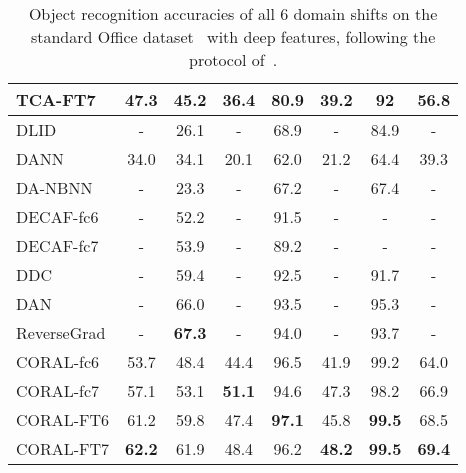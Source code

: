 \documentclass[letterpaper]{article}
\begin{document}
\begin{table}[t]
\begin{center}
{\begin{tabular}{|l||c|c|c|c|c|c|c|}
TCA-FT7	&47.3	&45.2	&36.4	&80.9	&39.2	&92 &56.8 \\
\hline
\hline
DLID	&-&	26.1&-&		68.9&-&84.9&-\\ 
\hline
DANN &34.0	&34.1&	20.1&	62.0&	21.2&	64.4&39.3\\
\hline
DA-NBNN	&-	&23.3&	-&	67.2&	-&	67.4&-\\
\hline
DECAF-fc6  &-	&52.2&	-&	91.5&	-&	-&-\\
\hline
DECAF-fc7  &-	&53.9&	-&	89.2&	-&	-&-\\
\hline
DDC	 &-	&59.4	&-	&92.5	&-	&91.7  &- \\
\hline
DAN	 &-	&66.0	&-	&93.5	&-	&95.3  &- \\
\hline
ReverseGrad	 &-	&\textbf{67.3}	&-	&94.0	&-	&93.7  &- \\
\hline
\hline
CORAL-fc6	&53.7	&48.4	&44.4	&96.5	&41.9	&99.2&64.0\\
\hline
CORAL-fc7	&57.1	&53.1	&\textbf{51.1}	&94.6	&47.3	&98.2&66.9\\
\hline
CORAL-FT6	&61.2	&59.8	&47.4	&\textbf{97.1}	&45.8	&\textbf{99.5}&68.5\\
\hline
CORAL-FT7	&\textbf{62.2}	&61.9	&48.4	&96.2	&\textbf{48.2}	&\textbf{99.5}&\textbf{69.4}\\
\hline
\end{tabular}
}
\end{center}
\caption{\small Object recognition accuracies of all 6 domain shifts on the standard Office dataset~\cite{saenko2010adapting} with deep features, following the protocol of~\cite{decaf,tzeng_arxiv15,reversegrad}. }
\label{tab:result_office10}
\vspace{-0.1in}
\end{table}
\end{document}
